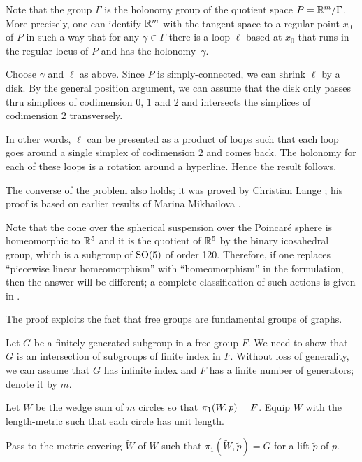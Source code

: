 Note that the group $\Gamma$ is the holonomy group of the quotient space $P=\mathbb{R}^m/\Gamma$.
More precisely, one can identify $\mathbb{R}^m$ with the tangent space to a regular point $x_0$ of $P$ in such a way that
for any $\gamma\in\Gamma$ there is a loop $\ell$ based at $x_0$ that runs in the regular locus of $P$ and has the holonomy~$\gamma$.

Choose $\gamma$ and $\ell$ as above.
Since $P$ is simply-connected, we can shrink $\ell$ by a disk.
By the general position argument, we can assume that the disk 
only passes thru simplices of codimension $0$, $1$ and $2$
and intersects the simplices of codimension $2$ transversely.

In other words, $\ell$ can be presented as a product of
loops such that each loop goes around a single simplex of codimension $2$ and comes back.
The holonomy for each of these loops is a rotation around a hyperline.
Hence the result follows.
\qeds

The converse of the problem also holds;
it was proved by Christian Lange \cite{lange2016};
his proof is based on earlier results of 
Marina Mikhailova \cite{mikhailova}.

Note that the cone over the spherical suspension over the Poincaré sphere is homeomorphic to $\mathbb{R}^5$ and it is the quotient of $\mathbb{R}^5$ by the binary icosahedral group, which is a subgroup of $\mathrm{SO}(5)$ of order 120. 
Therefore, 
if one replaces ``piecewise linear homeomorphism'' with ``homeomorphism'' in the formulation, 
then the answer will be different; 
a complete classification of such actions is given in \cite{lange2019}.

The proof exploits the fact that free groups are fundamental groups of graphs.

\medskip

Let $G$ be a finitely generated subgroup in a free group $F$.
We need to show that $G$ is an intersection of subgroups of finite index in $F$.
Without loss of generality, we can assume that $G$ has infinite index and $F$ has a finite number of generators; denote it by $m$.

Let $W$ be the wedge sum of $m$ circles so that $\pi_1(W,p)\z=F$.
Equip $W$ with the length-metric such that each circle has unit length.

Pass to the metric covering $\tilde W$ of $W$ 
such that  $\pi_1(\tilde W,\tilde p)=G$ 
for a lift $\tilde p$ of $p$.

